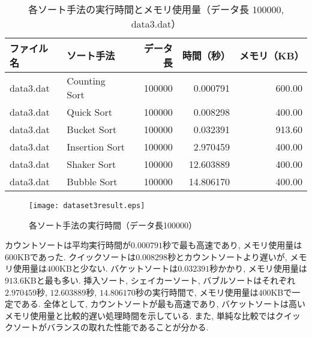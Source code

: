 \documentclass[a4j, 11pt]{jarticle}
\begin{document}
\begin{table}[H]
  \centering
  \caption{各ソート手法の実行時間とメモリ使用量（データ長 100000, data3.dat）}\label{dataset3allresult}
  \begin{tabular}{|l|l|r|r|r|}
    \hline
    \textbf{ファイル名} & \textbf{ソート手法} & \textbf{データ長} & \textbf{時間（秒）} & \textbf{メモリ（KB）} \\
    \hline
    data3.dat & Counting Sort  & 100000 & 0.000791  & 600.00 \\
    data3.dat & Quick Sort     & 100000 & 0.008298  & 400.00 \\
    data3.dat & Bucket Sort    & 100000 & 0.032391  & 913.60 \\
    data3.dat & Insertion Sort & 100000 & 2.970459  & 400.00 \\
    data3.dat & Shaker Sort    & 100000 & 12.603889 & 400.00 \\
    data3.dat & Bubble Sort    & 100000 & 14.806170 & 400.00 \\
    \hline
  \end{tabular}
\end{table}
\begin{figure}[H]
  \centering
  \texttt{[image: dataset3result.eps]}
  \caption{各ソート手法の実行時間（データ長100000）}\label{dataset3allresultgraph}
\end{figure}
カウントソートは平均実行時間が$0.000791$秒で最も高速であり, メモリ使用量は$600$KBであった. 
クイックソートは$0.008298$秒とカウントソートより遅いが, メモリ使用量は$400$KBと少ない. 
バケットソートは$0.032391$秒かかり, メモリ使用量は$913.6$KBと最も多い. 
挿入ソート, シェイカーソート, バブルソートはそれぞれ$2.970459$秒, $12.603889$秒, $14.806170$秒の実行時間で, メモリ使用量は$400$KBで一定である. 
全体として, カウントソートが最も高速であり, バケットソートは高いメモリ使用量と比較的遅い処理時間を示している. 
また, 単純な比較ではクイックソートがバランスの取れた性能であることが分かる. 
\end{document}
